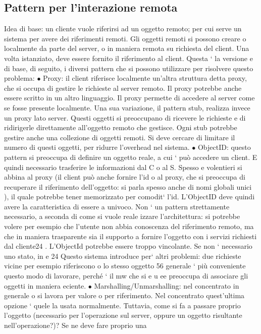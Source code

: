 \documentclass[a4paper,12pt]{article}
\begin{document}
\subsection{Pattern per l'interazione remota}
Idea di base: un cliente vuole riferirsi ad un oggetto remoto; per cui serve un
sistema per avere dei riferimenti remoti. Gli oggetti remoti si possono creare o
localmente da parte del server, o in maniera remota su richiesta del client. Una
volta istanziato, deve essere fornito il riferimento al client. Questa ` la versione
e
di base, di seguito, i diversi pattern che si possono utilizzare per risolvere questo
problema:
$\bullet$ Proxy: il client riferisce localmente un'altra struttura detta proxy, che si
occupa di gestire le richieste al server remoto. Il proxy potrebbe anche
essere scritto in un altro linguaggio. Il proxy permette di accedere al server
come se fosse presente localmente.
Una sua variazione, il pattern stub, realizza invece un proxy lato server.
Questi oggetti si preoccupano di ricevere le richieste e di ridirigerle direttamente all'oggetto remoto che gestisce.
Ogni stub potrebbe gestire anche
una collezione di oggetti remoti.
Si deve cercare di limitare il numero di questi oggetti, per ridurre l'overhead nel sistema.
$\bullet$ ObjectID: questo pattern si preoccupa di definire un oggetto reale, a cui
`
può accedere un client. E quindi necessario trasferire le informazioni dal C
o
al S. Spesso e volentieri si abbina al proxy (il client può anche fornire l'id
o
al proxy, che si preoccupa di recuperare il riferimento dell'oggetto: si parla
spesso anche di nomi globali unici ), il quale potrebbe tener memorizzato
per comodit` l'id. L'ObjectID deve quindi avere la caratteristica di essere
a
univoco.
Non ` un pattern strettamente necessario, a seconda di come si vuole reale
izzare l'architettura: si potrebbe volere per esempio che l'utente non abbia
conoscenza del riferimento remoto, ma che in maniera trasparente sia il
supporto a fornire l'oggetto con i servizi richiesti dal cliente24 . L'ObjectId potrebbe essere troppo vincolante. Se
non ` necessario uno stato, in
e
24 Questo sistema introduce per` altri problemi: due richieste vicine per esempio riferiscono
o
lo stesso oggetto
56
generale ` più conveniente questo modo di lavorare, perché ` il mw che si
e u
ee
preoccupa di associare gli oggetti in maniera eciente.
$\bullet$ Marshalling/Unmarshalling: nel concentrato in generale o si lavora per
valore o per riferimento. Nel concentrato quest'ultima opzione ` quele
la usata normalmente. Tuttavia, come si fa a passare proprio l'oggetto
(necessario per l'operazione sul server, oppure un oggetto risultante nell'operazione?)? Se ne deve fare proprio una
\end{document}
